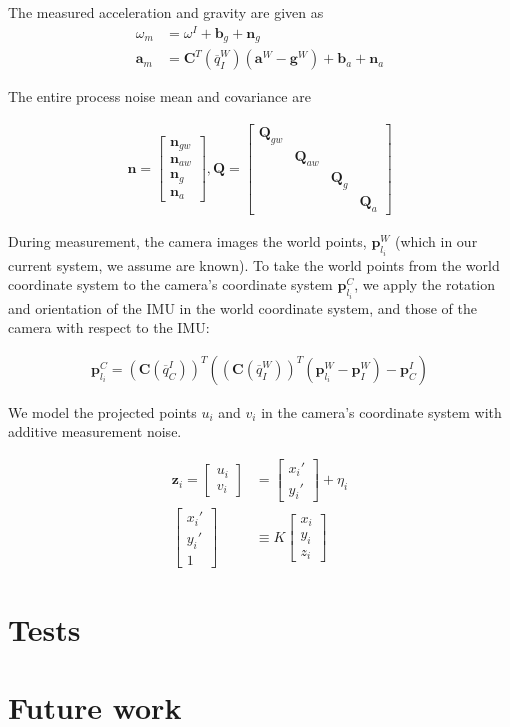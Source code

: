 \documentclass[letterpaper]{article}
\newcommand{\bb}[1]{\mathbf{#1}}
\begin{document}
The measured acceleration and gravity are given as
\begin{align}
\omega_m&=\omega^I+\bb{b}_g+\bb{n}_g \nonumber \\
\bb{a}_m&=\bb{C}^T(\overline{q}_I^W)(\bb{a}^W-\bb{g}^W)+\bb{b}_a+\bb{n}_a
\end{align}

The entire process noise mean and covariance are

\begin{align}
\bb{n}=\begin{bmatrix} \bb{n}_{gw} \\ \bb{n}_{aw} \\ \bb{n}_g\\ \bb{n}_a \end{bmatrix}, \bb{Q}=\begin{bmatrix} \bb{Q}_{gw} & & & \\ & \bb{Q}_{aw} & & \\ & & \bb{Q}_g & \\ & & & \bb{Q}_a \end{bmatrix}
\end{align}

During measurement, the camera images the world points, $\bb{p}_{l_i}^W$ (which in our current system, we assume are known). To take the world points from the world coordinate system to the camera's coordinate system $\bb{p}_{l_i}^C$, we apply the rotation and orientation of the IMU in the world coordinate system, and those of the camera with respect to the IMU:

\begin{align}
\bb{p}_{l_i}^C=(\bb{C}(\overline{q}_C^I))^T \left((\bb{C}(\overline{q}_I^W))^T \left(\bb{p}_{l_i}^W-\bb{p}_I^W\right) -\bb{p}_C^I \right)
\end{align}

We model the projected points $u_i$ and $v_i$ in the camera's coordinate system with additive measurement noise. 

\begin{align}
\bb{z}_i=\begin{bmatrix} u_i \\ v_i \end{bmatrix}&=\begin{bmatrix} x_i' \\ y_i' \end{bmatrix}+\eta_i \nonumber\\
\begin{bmatrix} x_i' \\ y_i' \\ 1 \end{bmatrix} & \equiv K\begin{bmatrix} x_i \\ y_i  \\ z_i \end{bmatrix}
\end{align}



\section{Tests}

\section{Future work}

\end{document}
